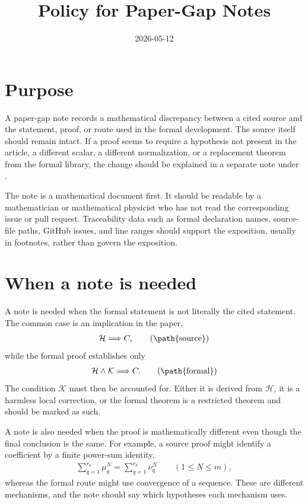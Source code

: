 \documentclass{article}
\title{Policy for Paper-Gap Notes}
\author{}
\date{2026-05-12}
\begin{document}
\maketitle

\section{Purpose}

A paper-gap note records a mathematical discrepancy between a cited source and
the statement, proof, or route used in the formal development. The source
itself should remain intact. If a proof seems to require a hypothesis not
present in the article, a different scalar, a different normalization, or a
replacement theorem from the formal library, the change should be explained in a
separate note under .

The note is a mathematical document first. It should be readable by a
mathematician or mathematical physicist who has not read the corresponding
issue or pull request. Traceability data such as formal declaration names,
source-file paths, GitHub issues, and line ranges should support the exposition,
usually in footnotes, rather than govern the exposition.

\section{When a note is needed}

A note is needed when the formal statement is not literally the cited
statement. The common case is an implication in the paper,
\begin{align}
    \mathcal H \Longrightarrow C,
    \tag{\path{source}}
\end{align}
while the formal proof establishes only
\begin{align}
    \mathcal H\wedge\mathcal K \Longrightarrow C.
    \tag{\path{formal}}
\end{align}
The condition $\mathcal K$ must then be accounted for. Either it is derived
from $\mathcal H$, it is a harmless local correction, or the formal theorem is
a restricted theorem and should be marked as such.

A note is also needed when the proof is mathematically different even though
the final conclusion is the same. For example, a source proof might identify a
coefficient by a finite power-sum identity,
\begin{align}
    \sum_{q=1}^{r_a}\mu_q^N
    =\sum_{q=1}^{r_b}\nu_q^N
    \qquad (1\leq N\leq m),
\end{align}
whereas the formal route might use convergence of a sequence. These are
different mechanisms, and the note should say which hypotheses each mechanism
uses.
\end{document}
